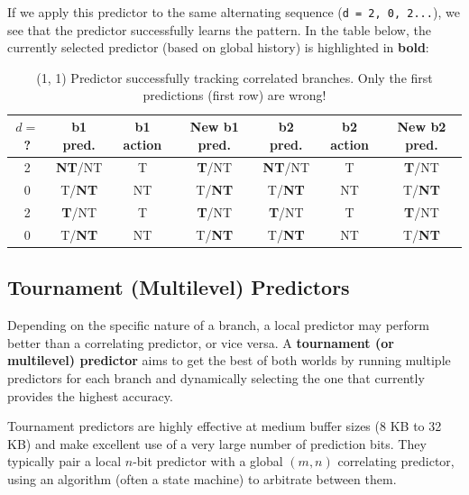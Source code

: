 If we apply this predictor to the same alternating sequence (\texttt{d = 2, 0, 2...}), we see that the predictor successfully learns the pattern. In the table below, the currently selected predictor (based on global history) is highlighted in \textbf{bold}:

\begin{table}[htpb]
    \centering
    \renewcommand{\arraystretch}{1.2}
    \begin{tabular}{c c c c | c c c}
        \textbf{\(d=\)?} & \textbf{b1 pred.} & \textbf{b1 action} & \textbf{New b1 pred.} & \textbf{b2 pred.} & \textbf{b2 action} & \textbf{New b2 pred.} \\
        \hline
        2 & \textbf{NT}/NT & T  & \textbf{T}/NT  & \textbf{NT}/NT & T  & \textbf{T}/NT \\
        0 & T/\textbf{NT}  & NT & T/\textbf{NT}  & T/\textbf{NT}  & NT & T/\textbf{NT} \\
        2 & \textbf{T}/NT  & T  & \textbf{T}/NT  & \textbf{T}/NT  & T  & \textbf{T}/NT \\
        0 & T/\textbf{NT}  & NT & T/\textbf{NT}  & T/\textbf{NT}  & NT & T/\textbf{NT} \\
        \hline
    \end{tabular}
    \caption{(1, 1) Predictor successfully tracking correlated branches. Only the first predictions (first row) are wrong!}
    \label{tab:1-1-success}
\end{table}

\subsection{Tournament (Multilevel) Predictors}

Depending on the specific nature of a branch, a local predictor may perform better than a correlating predictor, or vice versa. A \textbf{tournament (or multilevel) predictor} aims to get the best of both worlds by running multiple predictors for each branch and dynamically selecting the one that currently provides the highest accuracy.

Tournament predictors are highly effective at medium buffer sizes (8 KB to 32 KB) and make excellent use of a very large number of prediction bits. They typically pair a local \(n\)-bit predictor with a global \((m, n)\) correlating predictor, using an algorithm (often a state machine) to arbitrate between them.

